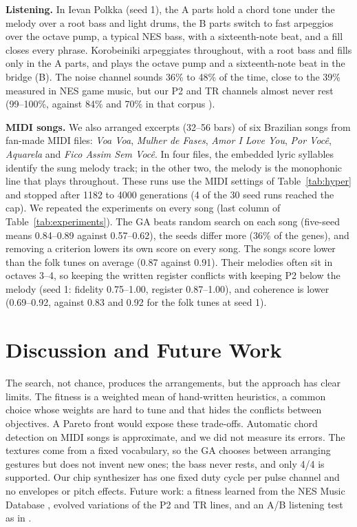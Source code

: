 \documentclass{article}
\begin{document}
\textbf{Listening.} In Ievan Polkka (seed 1), the A parts hold a chord tone under the melody over a
root bass and light drums, the B parts switch to fast arpeggios over the octave pump, a typical NES
bass, with a sixteenth-note beat, and a fill closes every phrase. Korobeiniki arpeggiates
throughout, with a root bass and fills only in the A parts, and plays the octave pump and a
sixteenth-note beat in the bridge (B). The noise channel sounds 36\% to 48\% of the time, close to
the 39\% measured in NES game music, but our P2 and TR channels almost never rest (99--100\%,
against 84\% and 70\% in that corpus \cite{donahue2018nes}).

\textbf{MIDI songs.} We also arranged excerpts (32--56 bars) of six Brazilian songs from fan-made
MIDI files: \emph{Voa Voa}, \emph{Mulher de Fases}, \emph{Amor I Love You}, \emph{Por Voc\^e},
\emph{Aquarela} and \emph{Fico Assim Sem Voc\^e}.
In four files, the embedded lyric syllables identify the sung melody track; in the other two, the
melody is the monophonic line that plays throughout. These runs use the MIDI settings of
Table~\ref{tab:hyper} and stopped after 1182 to 4000 generations (4 of the 30 seed runs reached
the cap). We repeated the experiments on every song (last column of Table~\ref{tab:experiments}).
The GA beats random search on each song (five-seed means 0.84--0.89 against 0.57--0.62), the seeds
differ more (36\% of the genes), and removing a criterion lowers its own score on every song. The
songs score lower than the folk tunes on average (0.87 against 0.91). Their melodies often sit in
octaves 3--4, so keeping the written register conflicts with keeping P2 below the melody (seed 1:
fidelity 0.75--1.00, register 0.87--1.00), and coherence is lower (0.69--0.92, against 0.83 and
0.92 for the folk tunes at seed 1).

\section{Discussion and Future Work}\label{sec:discussion}

The search, not chance, produces the arrangements, but the approach has clear limits. The fitness is a weighted mean of hand-written heuristics, a common choice whose weights are hard to tune \cite{fernandez2013ai} and that hides the conflicts between objectives. A Pareto front \cite{freitas2011melody,carpentier2010solving}
would expose these trade-offs. Automatic chord detection on MIDI songs is approximate, and we did not measure its errors. The textures come from a fixed vocabulary, so the GA chooses between arranging gestures but does
not invent new ones; the bass never rests, and only 4/4 is supported. Our chip synthesizer has one
fixed duty cycle per pulse channel and no envelopes or pitch effects. Future work: a fitness learned from the NES Music
Database \cite{donahue2018nes}, evolved variations of the P2 and TR lines, and an A/B listening
test as in \cite{donahue2019lakhnes}.


\end{document}
